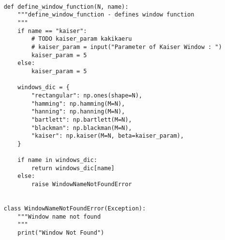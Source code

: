 \begin{lstlisting}[caption=plot\_tools.py,label=plot_tools.py]
    
    def define_window_function(N, name):
        """define_window_function - defines window function
        """
        if name == "kaiser":
            # TODO kaiser_param kakikaeru
            # kaiser_param = input("Parameter of Kaiser Window : ")
            kaiser_param = 5
        else:
            kaiser_param = 5
    
        windows_dic = {
            "rectangular": np.ones(shape=N),
            "hamming": np.hamming(M=N),
            "hanning": np.hanning(M=N),
            "bartlett": np.bartlett(M=N),
            "blackman": np.blackman(M=N),
            "kaiser": np.kaiser(M=N, beta=kaiser_param),
        }
    
        if name in windows_dic:
            return windows_dic[name]
        else:
            raise WindowNameNotFoundError
    
    
    class WindowNameNotFoundError(Exception):
        """Window name not found
        """
        print("Window Not Found")
    
\end{lstlisting}

